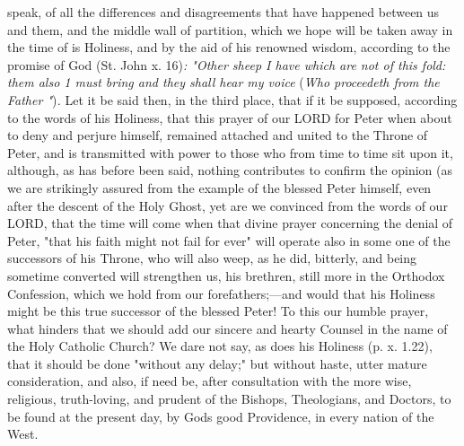 speak, of all the differences and disagreements that have happened
between us and them, and the middle wall of partition, which we hope
will be taken away in the time of is Holiness, and by the aid of his
renowned wisdom, according to the promise of God (St. John x. 16)\emph{:
"Other sheep I have which are not of this fold: them also 1 must bring
and they shall hear my voice} (\emph{Who proceedeth from the Father
"})\emph{.} Let it be said then, in the third place, that if it be
supposed, according to the words of his Holiness, that this prayer of
our LORD for Peter when about to deny and perjure himself, remained
attached and united to the Throne of Peter, and is transmitted with
power to those who from time to time sit upon it, although, as has
before been said, nothing contributes to confirm the opinion (as we are
strikingly assured from the example of the blessed Peter himself, even
after the descent of the Holy Ghost, yet are we convinced from the words
of our LORD, that the time will come when that divine prayer concerning
the denial of Peter, "that his faith might not fail for ever" will
operate also in some one of the successors of his Throne, who will also
weep, as he did, bitterly, and being sometime converted will strengthen
us, his brethren, still more in the Orthodox Confession, which we hold
from our forefathers;---and would that his Holiness might be this true
successor of the blessed Peter! To this our humble prayer, what hinders
that we should add our sincere and hearty Counsel in the name of the
Holy Catholic Church? We dare not say, as does his Holiness (p. x.
1.22), that it should be done "without any delay;" but without haste,
utter mature consideration, and also, if need be, after consultation
with the more wise, religious, truth-loving, and prudent of the Bishops,
Theologians, and Doctors, to be found at the present day, by
God\textquotesingle s good Providence, in every nation of the West.


